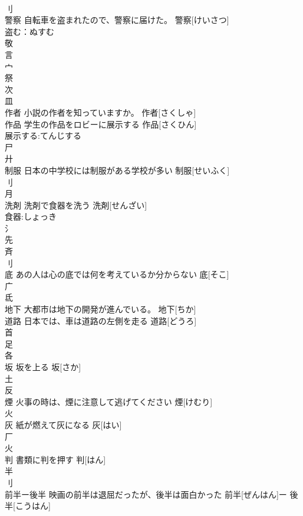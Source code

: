 \documentclass[8pt]{extreport}
\begin{document}
\begin{CJK}{UTF8}{min}
\\	刂 
\\	警察	自転車を盗まれたので、警察に届けた。	警察[けいさつ]			
\\	盗む：ぬすむ
\\	敬 
\\	言 
\\	宀 
\\	祭 
\\	次 
\\	皿 
\\	作者	小説の作者を知っていますか。	作者[さくしゃ]			
\\	作品	学生の作品をロビーに展示する	作品[さくひん]			
\\	展示する:てんじする
\\	尸 
\\	廾 
\\	制服	日本の中学校には制服がある学校が多い	制服[せいふく]			
\\	刂 
\\	月 
\\	洗剤	洗剤で食器を洗う	洗剤[せんざい]			
\\	食器:しょっき
\\	氵 
\\	先 
\\	斉 
\\	刂 
\\	底	あの人は心の底では何を考えているか分からない	底[そこ]			
\\	广 
\\	氐 
\\	地下	大都市は地下の開発が進んでいる。	地下[ちか]			
\\	道路	日本では、車は道路の左側を走る	道路[どうろ]			
\\	首 
\\	足 
\\	各 
\\	坂	坂を上る	坂[さか]			
\\	土 
\\	反 
\\	煙	火事の時は、煙に注意して逃げてください	煙[けむり]			
\\	火 
\\	灰	紙が燃えて灰になる	灰[はい]			
\\	厂 
\\	火 
\\	判	書類に判を押す	判[はん]			
\\	半 
\\	刂 
\\	前半ー後半	映画の前半は退屈だったが、後半は面白かった	前半[ぜんはん]ー 後半[こうはん]			

\end{CJK}
\end{document}
